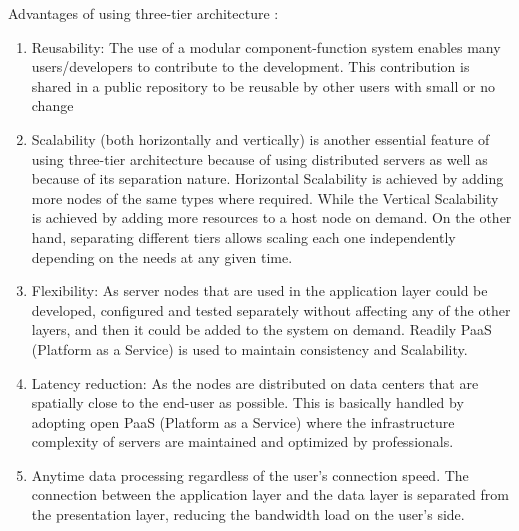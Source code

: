 \documentclass{scsSimAUDPaperFormat}
\begin{document}
Advantages of using three-tier architecture \cite{Furht2010HandbookComputing}:
\begin{enumerate}
    \item Reusability: The use of a modular component-function system enables many users/developers to contribute to the development. This contribution is shared in a public repository to be reusable by other users with small or no change
    \item Scalability (both horizontally and vertically) is another essential feature of using three-tier architecture because of using distributed servers as well as because of its separation nature. Horizontal Scalability is achieved by adding more nodes of the same types where required. While the Vertical Scalability is achieved by adding more resources to a host node on demand. On the other hand, separating different tiers allows scaling each one independently depending on the needs at any given time. 
    \item Flexibility: As server nodes that are used in the application layer could be developed, configured and tested separately without affecting any of the other layers, and then it could be added to the system on demand. Readily PaaS (Platform as a Service) is used to maintain consistency and Scalability. 
    \item Latency reduction: As the nodes are distributed on data centers that are spatially close to the end-user as possible. This is basically handled by adopting open PaaS (Platform as a Service) where the infrastructure complexity of servers are maintained and optimized by professionals. 
    \item Anytime data processing regardless of the user's connection speed. The connection between the application layer and the data layer is separated from the presentation layer, reducing the bandwidth load on the user's side.
    
\end{enumerate}
\end{document}
